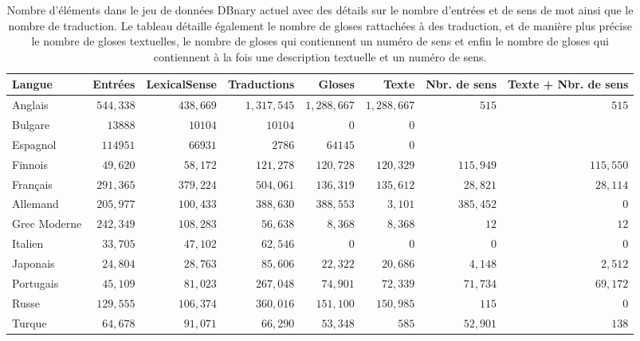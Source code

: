 \documentclass[10pt,a4paper,twoside]{article}
\begin{document}
\begin{table}[htb!]
\begin{center}\begin{footnotesize}
\begin{tabular}{lrrrrrrr}
\textbf{Langue} & \textbf{Entrées} & \textbf{LexicalSense} & \textbf{Traductions} & \textbf{Gloses} & \textbf{Texte} &  \textbf{Nbr. de sens} & \textbf{Texte + Nbr. de sens }\\
\hline
Anglais & $544,338$ & $438,669$ & $1,317,545$ & $1,288,667$ & $1,288,667$ & $515$ & $515$ \\
Bulgare & $13888$ & $10104$ & $10104$ & $0$ & $0$ \\
Espagnol & $114951$ & $66931$ & $2786$ & $64145$ & $0$ \\
Finnois & $49,620$ & $58,172$ & $121,278$ & $120,728$ & $120,329$ & $115,949$ & $115,550$ \\
Français & $291,365$ & $379,224$ & $504,061$ & $136,319$ & $135,612$ & $28,821$ & $28,114$ \\
Allemand & $205,977$ & $100,433$ & $388,630$ & $388,553$ & $3,101$ & $385,452$ & $0$ \\
Grec Moderne & $242,349$ & $108,283$ & $56,638$ & $8,368$ & $8,368$ & $12$ & $12$ \\
Italien & $33,705$ & $47,102$ & $62,546$ & $0$ & $0$ & $0$ & $0$ \\
Japonais & $24,804$ & $28,763$ & $85,606$ & $22,322$ & $20,686$ & $4,148$ & $2,512$ \\
Portugais & $45,109$ & $81,023$ & $267,048$ & $74,901$ & $72,339$ & $71,734$ & $69,172$ \\
Russe & $129,555$ & $106,374$ & $360,016$ & $151,100$ & $150,985$ & $115$ & $0$ \\
Turque & $64,678$ & $91,071$ & $66,290$ & $53,348$ & $585$ & $52,901$ & $138$ \\

\hline
\end{tabular}
\caption{Nombre d'éléments dans le jeu de données DBnary actuel avec des détails sur le nombre d'entrées et de sens de mot ainsi que le nombre de traduction. Le tableau détaille également le nombre de gloses rattachées à des traduction, et de manière plus précise le nombre de gloses textuelles, le nombre de gloses qui contiennent un numéro de sens et enfin le nombre de gloses qui contiennent à la fois une description textuelle et un numéro de sens.}
\label{lemon-elts}
\end{footnotesize}\end{center}
\end{table}
\end{document}
